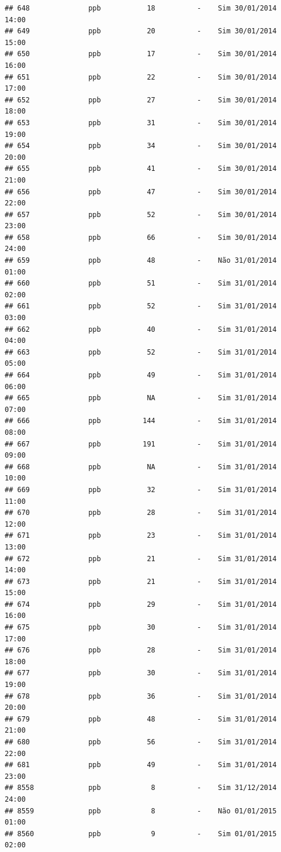 \documentclass[]{book}
\begin{document}
\begin{verbatim}
## 648              ppb           18          -    Sim 30/01/2014 14:00
## 649              ppb           20          -    Sim 30/01/2014 15:00
## 650              ppb           17          -    Sim 30/01/2014 16:00
## 651              ppb           22          -    Sim 30/01/2014 17:00
## 652              ppb           27          -    Sim 30/01/2014 18:00
## 653              ppb           31          -    Sim 30/01/2014 19:00
## 654              ppb           34          -    Sim 30/01/2014 20:00
## 655              ppb           41          -    Sim 30/01/2014 21:00
## 656              ppb           47          -    Sim 30/01/2014 22:00
## 657              ppb           52          -    Sim 30/01/2014 23:00
## 658              ppb           66          -    Sim 30/01/2014 24:00
## 659              ppb           48          -    Não 31/01/2014 01:00
## 660              ppb           51          -    Sim 31/01/2014 02:00
## 661              ppb           52          -    Sim 31/01/2014 03:00
## 662              ppb           40          -    Sim 31/01/2014 04:00
## 663              ppb           52          -    Sim 31/01/2014 05:00
## 664              ppb           49          -    Sim 31/01/2014 06:00
## 665              ppb           NA          -    Sim 31/01/2014 07:00
## 666              ppb          144          -    Sim 31/01/2014 08:00
## 667              ppb          191          -    Sim 31/01/2014 09:00
## 668              ppb           NA          -    Sim 31/01/2014 10:00
## 669              ppb           32          -    Sim 31/01/2014 11:00
## 670              ppb           28          -    Sim 31/01/2014 12:00
## 671              ppb           23          -    Sim 31/01/2014 13:00
## 672              ppb           21          -    Sim 31/01/2014 14:00
## 673              ppb           21          -    Sim 31/01/2014 15:00
## 674              ppb           29          -    Sim 31/01/2014 16:00
## 675              ppb           30          -    Sim 31/01/2014 17:00
## 676              ppb           28          -    Sim 31/01/2014 18:00
## 677              ppb           30          -    Sim 31/01/2014 19:00
## 678              ppb           36          -    Sim 31/01/2014 20:00
## 679              ppb           48          -    Sim 31/01/2014 21:00
## 680              ppb           56          -    Sim 31/01/2014 22:00
## 681              ppb           49          -    Sim 31/01/2014 23:00
## 8558             ppb            8          -    Sim 31/12/2014 24:00
## 8559             ppb            8          -    Não 01/01/2015 01:00
## 8560             ppb            9          -    Sim 01/01/2015 02:00

\end{verbatim}
\end{document}
